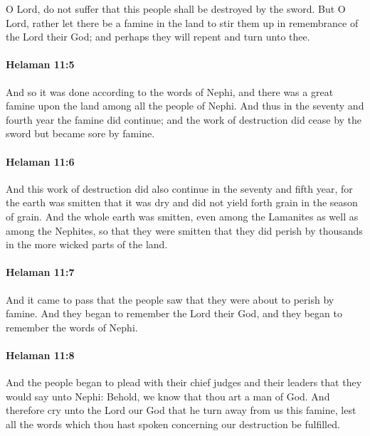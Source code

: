 			O Lord, do not suffer that this people shall be destroyed by the sword.
			But O Lord, rather let there be a famine in the land
			to stir them up in remembrance of the Lord their God;
			and perhaps they will repent and turn unto thee.

		\paragraph{Helaman 11:5} %
			\label{HELAMAN-11-5}

			And so it was done according to the words of Nephi,
			and there was a great famine upon the land among all the people of Nephi.
			And thus in the seventy and fourth year the famine did continue;
			and the work of destruction did cease by the sword
			but became sore by famine.

		\paragraph{Helaman 11:6} %
			\label{HELAMAN-11-6}

			And this work of destruction did also continue in the seventy and fifth year,
			for the earth was smitten
			that it was dry and did not yield forth grain in the season of grain.
			And the whole earth was smitten,
			even among the Lamanites as well as among the Nephites,
			so that they were smitten
			that they did perish by thousands in the more wicked parts of the land.

		\paragraph{Helaman 11:7} %
			\label{HELAMAN-11-7}

			And it came to pass that the people saw
			that they were about to perish by famine.
			And they began to remember the Lord their God,
			and they began to remember the words of Nephi.

		\paragraph{Helaman 11:8} %
			\label{HELAMAN-11-8}

			And the people began to plead with their chief judges and their leaders
			that they would say unto Nephi:
			Behold, we know that thou art a man of God.
			And therefore cry unto the Lord our God
			that he turn away from us this famine,
			lest all the words which thou hast spoken concerning our destruction be fulfilled.

